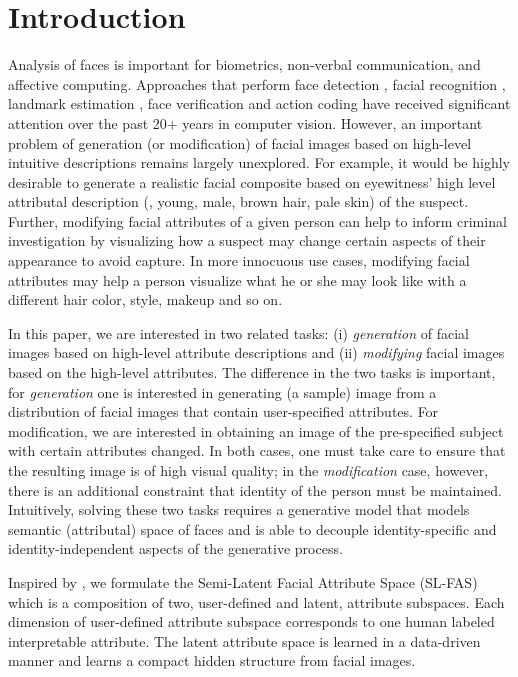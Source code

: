 \documentclass[10pt,letterpaper,twocolumn]{article}
\begin{document}
\vspace{-0.07in}
 

\section{Introduction}

Analysis of faces is important for biometrics, non-verbal communication,
and affective computing. Approaches that perform face detection \cite{chen2014joint,li_face},
facial recognition \cite{ahonen2006face,schroff2015facenet,wen2016discriminative},
landmark estimation \cite{burgos2013robust,zhang2014facial}, face
verification \cite{sun2014deep,taigman2014deepface} and action coding
have received significant attention over the past 20+ years in computer
vision. However, an important problem of generation (or modification)
of facial images based on high-level intuitive descriptions remains
largely unexplored. For example, it would be highly desirable to generate
a realistic facial composite based on eyewitness' high level attributal
description (\eg, young, male, brown hair, pale skin) of the suspect.
Further, modifying facial attributes of a given person can help to
inform criminal investigation by visualizing how a suspect may change
certain aspects of their appearance to avoid capture. In more innocuous
use cases, modifying facial attributes may help a person visualize
what he or she may look like with a different hair color, style, makeup
and so on.

In this paper, we are interested in two related tasks: (i) {\em
generation} of facial images based on high-level attribute descriptions
and (ii) {\em modifying} facial images based on the high-level
attributes. The difference in the two tasks is important, for {\em
generation} one is interested in generating (a sample) image from
a distribution of facial images that contain user-specified attributes.
For modification, we are interested in obtaining an image of the pre-specified
subject with certain attributes changed. In both cases, one must take
care to ensure that the resulting image is of high visual quality;
in the {\em modification} case, however, there is an additional
constraint that identity of the person must be maintained. Intuitively,
solving these two tasks requires a generative model that models semantic
(attributal) space of faces and is able to decouple identity-specific
and identity-independent aspects of the generative process.

Inspired by \cite{yanweiPAMIlatentattrib}, we formulate the Semi-Latent
Facial Attribute Space (SL-FAS) which is a composition of two, user-defined
and latent, attribute subspaces. Each dimension of user-defined attribute
subspace corresponds to one human labeled interpretable attribute.
The latent attribute space is learned in a data-driven manner and
learns a compact hidden structure from facial images.
\end{document}

